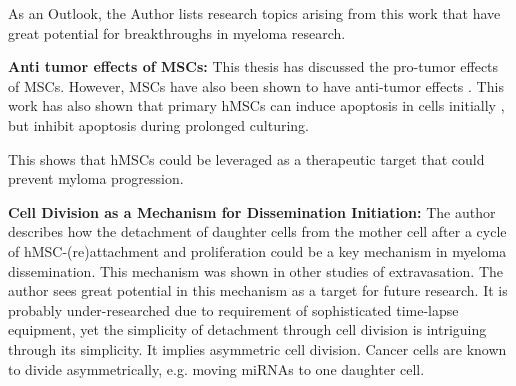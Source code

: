 \label{sec:discussion_potential_breakthroughs}
As an Outlook, the Author lists research topics arising from this work that have
great potential for breakthroughs in myeloma research.

\textbf{Anti tumor effects of MSCs:}
This thesis has discussed the pro-tumor effects of MSCs. However, MSCs have also
been shown to have anti-tumor effects \cite{galderisiMyelomaCellsCan2015}. This
work has also shown that primary \acp{hMSC} can induce apoptosis in  cells
initially ,
but inhibit apoptosis during prolonged culturing.

This shows that hMSCs could be leveraged
as a therapeutic target that could prevent myloma progression.




\textbf{Cell Division as a Mechanism for Dissemination Initiation:}
The author describes how the detachment of daughter cells from the mother cell
after a cycle of hMSC-(re)attachment and proliferation could be a key mechanism
in myeloma dissemination. This mechanism was shown in other studies of
extravasation. The author sees great potential in this mechanism as a target for
future research. It is probably under-researched due to requirement of
sophisticated time-lapse equipment, yet the simplicity of detachment through
cell division is intriguing through its simplicity. It implies asymmetric cell
division. Cancer cells are known to divide asymmetrically, e.g. moving miRNAs to
one daughter cell.








